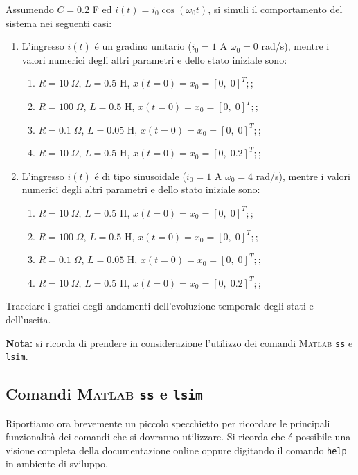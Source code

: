 \documentclass[../main.tex]{subfiles}
\begin{document}
Assumendo $C = 0.2$ F ed $i(t) = i_0 \cos(\omega_0 t)$, si simuli il comportamento del sistema nei seguenti casi:

\begin{enumerate}

	\item L'ingresso $i(t)$ é un gradino unitario ($i_0 = 1$ A $\omega_0 = 0$ rad/s), mentre i valori numerici degli altri parametri e dello stato iniziale sono:
	\begin{enumerate}
	\item $R = 10\;\Omega$, $L = 0.5$ H, $x(t=0) = x_0 = [0,\;0]^T;$;
	\item $R = 100\;\Omega$, $L = 0.5$ H, $x(t=0) = x_0 = [0,\;0]^T;$;
	\item $R = 0.1\;\Omega$, $L = 0.05$ H, $x(t=0) = x_0 = [0,\;0]^T;$;
	\item $R = 10\;\Omega$, $L = 0.5$ H, $x(t=0) = x_0 = [0,\;0.2]^T;$;
	\end{enumerate}
	
	\item L'ingresso $i(t)$ é di tipo sinusoidale ($i_0 = 1$ A $\omega_0 = 4$ rad/s), mentre i valori numerici degli altri parametri e dello stato iniziale sono:
	\begin{enumerate}
	\item $R = 10\;\Omega$, $L = 0.5$ H, $x(t=0) = x_0 = [0,\;0]^T;$;
	\item $R = 100\;\Omega$, $L = 0.5$ H, $x(t=0) = x_0 = [0,\;0]^T;$;
	\item $R = 0.1\;\Omega$, $L = 0.05$ H, $x(t=0) = x_0 = [0,\;0]^T;$;
	\item $R = 10\;\Omega$, $L = 0.5$ H, $x(t=0) = x_0 = [0,\;0.2]^T;$;
	\end{enumerate}

\end{enumerate}

Tracciare i grafici degli andamenti dell'evoluzione temporale degli stati e dell'uscita.

\textbf{Nota:} si ricorda di prendere in considerazione l'utilizzo dei comandi \textsc{Matlab} \texttt{ss} e \texttt{lsim}.

\subsection*{Comandi \textsc{Matlab} \texttt{ss} e \texttt{lsim}}

Riportiamo ora brevemente un piccolo specchietto per ricordare le principali funzionalità dei comandi che si dovranno utilizzare. Si ricorda che é possibile una visione completa della documentazione online oppure digitando il comando \texttt{help} in ambiente di sviluppo.\\
\end{document}
